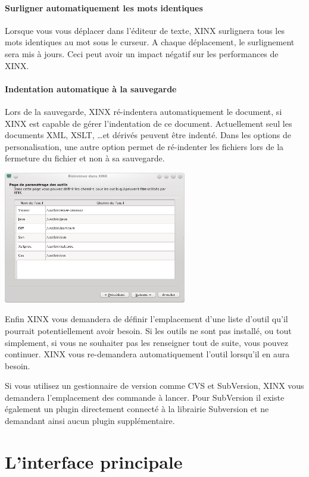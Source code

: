 \documentclass[a4paper,10pt,twoside]{book}
\begin{document}
\paragraph{Surligner automatiquement les mots identiques} Lorsque vous vous déplacer dans l'éditeur de texte, XINX surlignera tous les mots identiques au mot sous le curseur. A chaque déplacement, le surlignement sera mis à jours. Ceci peut avoir un impact négatif sur les performances de XINX.

\paragraph{Indentation automatique à la sauvegarde} Lors de la sauvegarde, XINX ré-indentera automatiquement le document, si XINX est capable de gérer l'indentation de ce document. Actuellement seul les documents XML, XSLT, \dots et dérivés peuvent être indenté. Dans les options de personalisation, une autre option permet de ré-indenter les fichiers lors de la fermeture du fichier et non à sa sauvegarde.

\begin{center}
 \includegraphics[width=0.60\textwidth]{./firstinstall4.png}
\end{center}

Enfin XINX vous demandera de définir l'emplacement d'une liste d'outil qu'il pourrait potentiellement avoir besoin. Si les outils ne sont pas installé, ou tout simplement, si vous ne souhaiter pas les renseigner tout de suite, vous pouvez continuer. XINX vous re-demandera automatiquement l'outil lorsqu'il en aura besoin.

Si vous utilisez un gestionnaire de version comme CVS et SubVersion, XINX vous demandera l'emplacement des commande à lancer. Pour SubVersion il existe également un plugin directement connecté à la librairie Subversion et ne demandant ainsi aucun plugin supplémentaire.

\section{L'interface principale}
\end{document}
